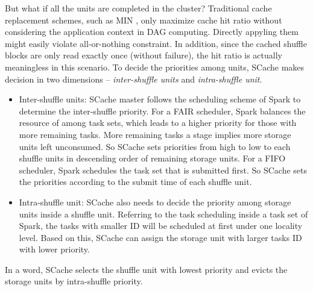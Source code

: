 But what if all the units are completed in the cluster? Traditional cache replacement schemes, such as MIN \cite{min}, only maximize cache hit ratio without considering the application context in DAG computing. 
Directly appyling them might easily violate all-or-nothing constraint.
In addition, since the cached shuffle blocks are only read exactly once (without failure), the hit ratio is actually meaningless in this scenario.
To decide the priorities among units, SCache makes decision in two dimensions -- \textit{inter-shuffle units} and \textit{intra-shuffle unit}. 
\begin{itemize}[noitemsep]
	\item Inter-shuffle units: SCache master follows the scheduling scheme of Spark to determine the inter-shuffle priority. For a FAIR scheduler, Spark balances the resource of among task sets, which leads to a higher priority for those with more remaining tasks. More remaining tasks a stage implies more storage units left unconsumed. So SCache sets priorities from high to low to each shuffle units in descending order of remaining storage units. For a FIFO scheduler, Spark schedules the task set that is submitted first. So SCache sets the priorities according to the submit time of each shuffle unit.
	\item Intra-shuffle unit: SCache also needs to decide the priority among storage units inside a shuffle unit. Referring to the task scheduling inside a task set of Spark, the tasks with smaller ID will be scheduled at first under one locality level. Based on this, SCache can assign the storage unit with larger tasks ID with lower priority.
\end{itemize}
In a word, SCache selects the shuffle unit with lowest priority and evicts the storage units by intra-shuffle priority.



